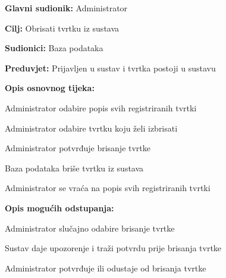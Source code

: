 					\begin{packed_item}
						
						\item \textbf{Glavni sudionik: } Administrator
						\item \textbf{Cilj:} Obrisati tvrtku iz sustava
						\item \textbf{Sudionici:} Baza podataka
						\item \textbf{Preduvjet:} Prijavljen u sustav i tvrtka postoji u sustavu
						\item \textbf{Opis osnovnog tijeka:}
						
						\item[] \begin{packed_enum}
							
							\item Administrator odabire popis svih registriranih tvrtki
							\item Administrator odabire tvrtku koju želi izbrisati
							\item Administrator potvrđuje brisanje tvrtke
							\item Baza podataka briše tvrtku iz sustava
							\item Administrator se vraća na popis svih registriranih tvrtki
							
						\end{packed_enum}
						
						\item \textbf{Opis mogućih odstupanja:}
						
						\item[] \begin{packed_item}
							
							\item[4.a] Administrator slučajno odabire brisanje tvrtke
							\item[] \begin{packed_enum}
								
								\item Sustav daje upozorenje i traži potvrdu prije brisanja tvrtke
								\item Administrator potvrđuje ili odustaje od brisanja tvrtke
								
							\end{packed_enum}
							
						\end{packed_item}
					\end{packed_item}
					
